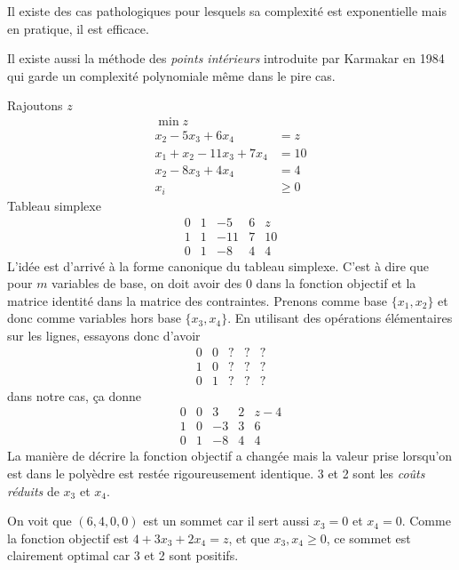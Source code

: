Il existe des cas pathologiques pour lesquels sa complexité est exponentielle
mais en pratique, il est efficace.

Il existe aussi la méthode des \emph{points intérieurs} introduite
par Karmakar en 1984 qui garde un complexité polynomiale même dans
le pire cas.

\begin{myexem}
  \label{ex:simplex}
  Rajoutons $z$
  \begin{align*}
    \min z\\
    x_2 - 5x_3+ 6x_4 & = z\\
    x_1 + x_2 - 11x_3 + 7x_4 & = 10\\
    x_2 - 8x_3 + 4x_4 & = 4\\
    x_i & \geq 0
  \end{align*}
  Tableau simplexe
  \[
    \begin{array}{cccc|c}
      0 & 1 & -5 & 6 & z\\
      \hline
      1 & 1 & -11 & 7 & 10\\
      0 & 1 & -8 & 4 & 4
    \end{array}
  \]
  L'idée est d'arrivé à la forme canonique du tableau simplexe.
  C'est à dire que pour $m$ variables de base, on doit avoir
  des $0$ dans la fonction objectif et la matrice identité
  dans la matrice des contraintes.
  Prenons comme base $\{x_1, x_2\}$ et
  donc comme variables hors base $\{x_3, x_4\}$.
  En utilisant des opérations élémentaires sur les lignes,
  essayons donc d'avoir
  \[
    \begin{array}{cccc|c}
      0 & 0 & ? & ? & ?\\
      \hline
      1 & 0 & ? & ? & ?\\
      0 & 1 & ? & ? & ?
    \end{array}
  \]
  dans notre cas, ça donne
  \[
    \begin{array}{cccc|c}
      0 & 0 & 3 & 2 & z-4\\
      \hline
      1 & 0 & -3 & 3 & 6\\
      0 & 1 & -8 & 4 & 4
    \end{array}
  \]
  La manière de décrire la fonction objectif a changée
  mais la valeur prise lorsqu'on
  est dans le polyèdre est restée rigoureusement identique.
  3 et 2 sont les \emph{coûts réduits} de $x_3$ et $x_4$.

  On voit que $(6, 4, 0, 0)$ est un sommet car il sert aussi $x_3 = 0$
  et $x_4 = 0$.
  Comme la fonction objectif est
  $4 + 3x_3 + 2x_4 = z$, et que $x_3, x_4 \geq 0$, ce sommet est clairement
  optimal car 3 et 2 sont positifs.


\end{myexem}
